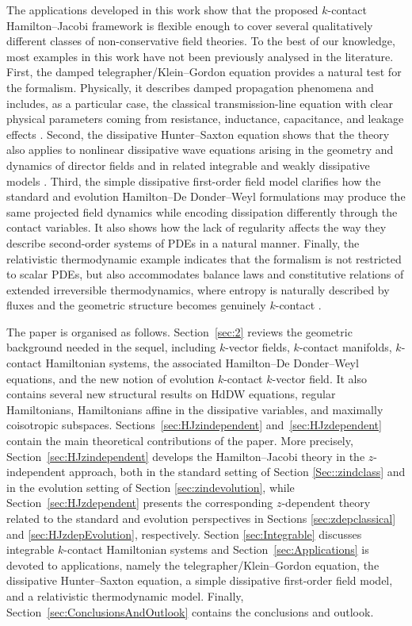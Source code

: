 \documentclass[11pt,twoside]{article}
\theoremstyle{plain}
\theoremstyle{definition}
\theoremstyle{remark}
\begin{document}
The applications developed in this work show that the proposed $k$-contact Hamilton--Jacobi framework is flexible enough to cover several qualitatively different classes of non-conservative field theories. To the best of our knowledge, most examples in this work have not been previously analysed in the literature. First, the damped telegrapher/Klein--Gordon equation provides a natural test for the formalism. Physically, it describes damped propagation phenomena and includes, as a particular case, the classical transmission-line equation with clear physical parameters coming from resistance, inductance, capacitance, and leakage effects \cite{RWD_94}. Second, the dissipative Hunter--Saxton equation shows that the theory also applies to nonlinear dissipative wave equations arising in the geometry and dynamics of director fields and in related integrable and weakly dissipative models \cite{HS_91,HZ_94,Len_07,WY_11,Wei_12,LZ_11}. Third, the simple dissipative first-order field model  clarifies how the standard and evolution Hamilton--De Donder--Weyl formulations may produce the same projected field dynamics while encoding dissipation differently through the contact variables. It also shows how the lack of regularity affects the way they describe second-order systems of PDEs in a natural manner. Finally, the relativistic thermodynamic example indicates that the formalism is not restricted to scalar PDEs, but also accommodates balance laws and constitutive relations of extended irreversible thermodynamics, where entropy is naturally described by fluxes and the geometric structure becomes genuinely $k$-contact \cite{BP_93,Bra_18,HLM_26}.

The paper is organised as follows. Section~\ref{sec:2} reviews the geometric background needed in the sequel, including $k$-vector fields, $k$-contact manifolds, $k$-contact Hamiltonian systems, the associated Hamilton--De Donder--Weyl equations, and the new notion of evolution $k$-contact  $k$-vector field. It also contains several new structural results on HdDW equations, regular Hamiltonians, Hamiltonians affine in the dissipative variables, and maximally coisotropic subspaces. Sections~\ref{sec:HJzindependent} and~\ref{sec:HJzdependent} contain the main theoretical contributions of the paper. More precisely, Section~\ref{sec:HJzindependent} develops the Hamilton--Jacobi theory in the $z$-independent approach, both in the standard setting of Section \ref{Sec::zindclass} and in the evolution setting  of Section \ref{sec:zindevolution}, while Section~\ref{sec:HJzdependent} presents the corresponding $z$-dependent theory related to the standard and evolution perspectives in Sections \ref{sec:zdepclassical} and \ref{sec:HJzdepEvolution}, respectively. Section \ref{sec:Integrable} discusses integrable $k$-contact Hamiltonian systems and  Section~\ref{sec:Applications} is devoted to applications, namely the telegrapher/Klein--Gordon equation, the dissipative Hunter--Saxton equation, a simple dissipative first-order field model, and a relativistic thermodynamic model. Finally, Section~\ref{sec:ConclusionsAndOutlook} contains the conclusions and outlook.
\end{document}
